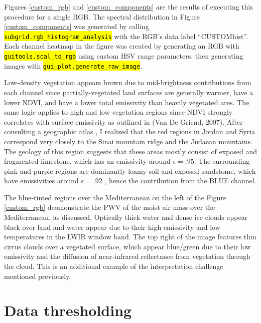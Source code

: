 \documentclass[12pt]{article}
\newcommand{\hltexttt}[1]{\texttt{\hl{#1}}}
\begin{document}
Figures \ref{custom_rgb} and \ref{custom_components} are the results of executing this procedure for a single RGB. The spectral distribution in Figure \ref{custom_components} was generated by calling \hltexttt{subgrid.rgb\_histogram\_analysis} with the RGB's data label ``CUSTOMhist''. Each channel heatmap in the figure was created by generating an RGB with \hltexttt{guitools.scal\_to\_rgb} using custom HSV range parameters, then generating images with \hltexttt{gui\_plot.generate\_raw\_image}.

 Low-density vegetation appears brown due to mid-brightness contributions from each channel since partially-vegetated land surfaces are generally warmer, have a lower NDVI, and have a lower total emissivity than heavily vegetated ares. The same logic applies to high and low-vegetation regions since NDVI strongly correlates with surface emissivity as outlined in (Van De Griend, 2007)\cite{griend2007}. After consulting a geographic atlas \cite{compactworldatlas}, I realized that the red regions in Jordan and Syria correspond very closely to the Sinai mountain ridge and the Judaean mountains. The geology of this region suggests that these areas mostly consist of exposed and fragmented limestone, which has an emissivity around $\epsilon=.95$. The surrounding pink and purple regions are dominantly loamy soil and exposed sandstome, which have emissivities around $\epsilon=.92$ \cite{compactworldatlas}\cite{mineo2021}\cite{bentor1980}, hence the contribution from the BLUE channel.

The blue-tinted regions over the Mediterranean on the left of the Figure \ref{custom_rgb} deomonstrate the PWV of the moist air mass over the Mediterranean, as discussed. Optically thick water and dense ice clouds appear black over land and water appear due to their high emissivity and low temperatures in the LWIR window band. The top right of the image features thin cirrus clouds over a vegetated surface, which appear blue/green due to their low emissivity and the diffusion of near-infrared reflectance from vegetation through the cloud. This is an additional example of the interpretation challenge mentioned previously.

\clearpage

\section{Data thresholding}\label{section_thresh}
\end{document}
